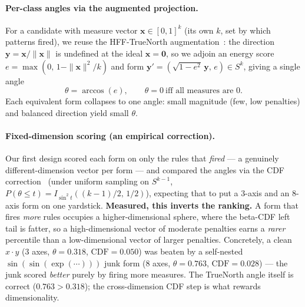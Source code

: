 \documentclass[sigconf]{acmart}
\begin{document}
\paragraph{Per-class angles via the augmented projection.} For a candidate with
measure vector $\mathbf{x}\in[0,1]^k$ (its own $k$, set by which patterns fired),
we reuse the HFF-TrueNorth augmentation~\cite{morgan2026hff,stolfi1991}: the
direction $\mathbf{y}=\mathbf{x}/\|\mathbf{x}\|$ is undefined at the ideal
$\mathbf{x}=\mathbf{0}$, so we adjoin an energy score
$e=\max(0,\,1-\|\mathbf{x}\|^2/k)$ and form
$\mathbf{y}'=(\sqrt{1-e^2}\,\mathbf{y},\,e)\in S^{k}$, giving a single angle
\begin{equation}
\label{eq:class-angle}
\theta = \arccos(e), \qquad \theta=0 \ \text{iff all measures are } 0.
\end{equation}
Each equivalent form collapses to one angle: small magnitude (few, low penalties)
and balanced direction yield small $\theta$.

\paragraph{Fixed-dimension scoring (an empirical correction).} Our first design
scored each form on only the rules that \emph{fired} --- a genuinely
different-dimension vector per form --- and compared the angles via the CDF
correction~\cite{cai2013angles} (under uniform sampling on $S^{k-1}$,
$P(\theta\le t) = I_{\sin^2 t}((k-1)/2,\,1/2)$), expecting that to put a 3-axis
and an 8-axis form on one yardstick. \textbf{Measured, this inverts the ranking.}
A form that fires \emph{more} rules occupies a higher-dimensional sphere, where
the beta-CDF left tail is fatter, so a high-dimensional vector of moderate
penalties earns a \emph{rarer} percentile than a low-dimensional vector of
larger penalties. Concretely, a clean $x\cdot y$ (3 axes, $\theta=0.318$,
$\mathrm{CDF}=0.050$) was beaten by a self-nested $\sin(\sin(\exp(\cdots)))$ junk
form (8 axes, $\theta=0.763$, $\mathrm{CDF}=0.028$) --- the junk scored
\emph{better} purely by firing more measures. The TrueNorth angle itself is
correct ($0.763>0.318$); the cross-dimension CDF step is what rewards
dimensionality.
\end{document}
